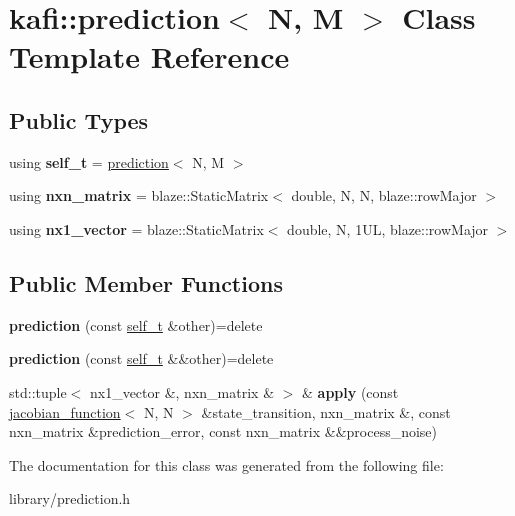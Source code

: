 \hypertarget{classkafi_1_1prediction}{}\section{kafi\+:\+:prediction$<$ N, M $>$ Class Template Reference}
\label{classkafi_1_1prediction}
\subsection*{Public Types}
\begin{DoxyCompactItemize}
\item 
\mbox{\label{classkafi_1_1prediction_a13da3540b254c21d3f407b17d199743b}} 
using {\bfseries self\+\_\+t} = \hyperlink{classkafi_1_1prediction}{prediction}$<$ N, M $>$
\item 
\mbox{\label{classkafi_1_1prediction_ac9d5346f2aebc993eb506109e0f91579}} 
using {\bfseries nxn\+\_\+matrix} = blaze\+::\+Static\+Matrix$<$ double, N, N, blaze\+::row\+Major $>$
\item 
\mbox{\label{classkafi_1_1prediction_a47ab0d9e6057b2c34603361e2ce26e2a}} 
using {\bfseries nx1\+\_\+vector} = blaze\+::\+Static\+Matrix$<$ double, N, 1\+U\+L, blaze\+::row\+Major $>$
\end{DoxyCompactItemize}
\subsection*{Public Member Functions}
\begin{DoxyCompactItemize}
\item 
\mbox{\label{classkafi_1_1prediction_a9b40f7f169dc8db5847c845ad3afb2e7}} 
{\bfseries prediction} (const \hyperlink{classkafi_1_1prediction}{self\+\_\+t} \&other)=delete
\item 
\mbox{\label{classkafi_1_1prediction_a02a1cdfabf957cfa49590ddcb161f2ac}} 
{\bfseries prediction} (const \hyperlink{classkafi_1_1prediction}{self\+\_\+t} \&\&other)=delete
\item 
\mbox{\label{classkafi_1_1prediction_a24aa3e00565379877c5497d52f76b5e3}} 
std\+::tuple$<$ nx1\+\_\+vector \&, nxn\+\_\+matrix \& $>$ \& {\bfseries apply} (const \hyperlink{classkafi_1_1jacobian__function}{jacobian\+\_\+function}$<$ N, N $>$ \&state\+\_\+transition, nxn\+\_\+matrix \&, const nxn\+\_\+matrix \&prediction\+\_\+error, const nxn\+\_\+matrix \&\&process\+\_\+noise)
\end{DoxyCompactItemize}


The documentation for this class was generated from the following file\+:\begin{DoxyCompactItemize}
\item 
library/prediction.\+h\end{DoxyCompactItemize}
